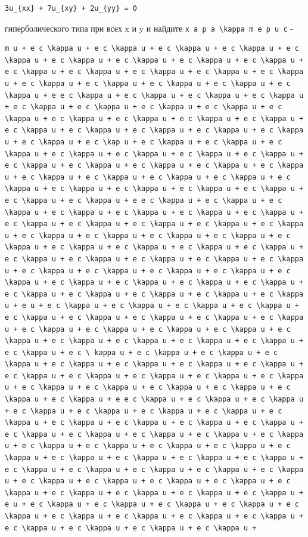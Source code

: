 \documentclass[
  ukrainian,
]{article}
\begin{document}
\begin{verbatim}
3u_{xx} + 7u_{xy} + 2u_{yy} = 0
\end{verbatim}

гиперболического типа при всех x и y и найдите
\texttt{x\ a\ p\ a\ \textbackslash{}kappa\ m\ e\ p\ u\ c} -

\begin{verbatim}
m u + e c \kappa u + e c \kappa u + e c \kappa u + e c \kappa u + e c \kappa u + e c \kappa u + e c \kappa u + e c \kappa u + e c \kappa u + e c \kappa u + e c \kappa u + e c \kappa u + e c \kappa u + e c \kappa u + e c \kappa u + e c \kappa u + e c \kappa u + e c \kappa u + e c \kappa u + e e c \kappa u + e c \kappa u + e c \kappa u + e c \kappa u + e c \kappa u + e c \kappa u + e c \kappa u + e c \kappa u + e c \kappa u + e c \kappa u + e c \kappa u + e c \kappa u + e c \kappa u + e c \kappa u + e c \kappa u + e c \kappa u + e c \kappa u + e c \kappa u + e c \kappa u + e c \kap u + e c \kappa u + e c \kappa u + e c \kappa u + e c \kappa u + e c \kappa u + e c \kappa u + e c \kappa u + e c \kappa u + e c \kappa u + e c \kappa u + e c \kappa u + e c \kappa u + e c \kappa u + e c \kappa u + e c \kappa u + e c \kappa u + e c \kappa u + e c \kappa u + e c \kappa u + e c \kappa u + e c \kappa u + e c \kappa u + e c \kappa u + e e c \kappa u + e c \kappa u + e c \kappa u + e c \kappa u + e c \kappa u + e c \kappa u + e c \kappa u + e c \kappa u + e c \kappa u + e c \kappa u + e c \kappa u + e c \kappa u + e c \kappa u + e c \kappa u + e c \kappa u + e c \kappa u + e c \kappa u + e c \kappa u + e c \kappa u + e c \kappa u + e c \kappa u + e c \kappa u + e c \kappa u + e c \kappa u + e c \kappa u + e c \kappa u + e c \kappa u + e c \kappa u + e c \kappa u + e c \kappa u + e c \kappa u + e c \kappa u + e c \kappa u + e c \kappa u + e c \kappa u + e c \kappa u + e c \kappa u + e c \kappa u + e c \kappa u + e c \kappa u + e u + e c \kappa u + e c \kappa u + e c \kappa u + e c \kappa u + e c \kappa u + e c \kappa u + e c \kappa u + e c \kappa u + e c \kappa u + e c \kappa u + e c \kappa u + e c \kappa u + e c \kappa u + e c \kappa u + e c \kappa u + e c \kappa u + e c \kappa u + e c \kappa u + e c \kappa u + e c \ kappa u + e c \kappa u + e c \kappa u + e c \kappa u + e c \kappa u + e c \kappa u + e c \kappa u + e c \kappa u + e c \kappa u + e c \kappa u + e c \kappa u + e c \kappa u + e c \kappa u + e c \kappa u + e c \kappa u + e c \kappa u + e c \kappa u + e c \kappa u + e c \kappa u + e e c \kappa u + e c \kappa u + e c \kappa u + e c \kappa u + e c \kappa u + e c \kappa u + e c \kappa u + e c \kappa u + e c \kappa u + e c \kappa u + e c \kappa u + e c \kappa u + e c \kappa u + e c \kappa u + e c \kappa u + e c \kappa u + e c \kappa u + e c \kappa u + e c \kappa u + e c \kappa u + e c \kappa u + e c \kappa u + e c \kappa u + e c \kappa u + e c \kappa u + e c \kappa u + e c \kappa u + e c \kappa u + e c \kappa u + e c \kappa u + e c \kappa u + e c \kappa u + e c \kappa u + e c \kappa u + e c \kappa u + e c \kappa u + e c \kappa u + e c \kappa u + e c \kappa u + e c \kappa u + e u + e c \kappa u + e c \kappa u + e c \kappa u + e c \kappa u + e c \kappa u + e c \kappa u + e c \kappa u + e c \kappa u + e c \kappa u + e c \kappa u + e c \kappa u + e c \kappa u + e c \kappa u + 
\end{verbatim}
\end{document}
